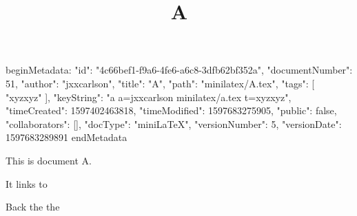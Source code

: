 beginMetadata:
{
    "id": "4c66bef1-f9a6-4fe6-a6c8-3dfb62bf352a",
    "documentNumber": 51,
    "author": "jxxcarlson",
    "title": "A",
    "path": "minilatex/A.tex",
    "tags": [
        "xyzxyz"
    ],
    "keyString": "a a=jxxcarlson minilatex/a.tex t=xyzxyz",
    "timeCreated": 1597402463818,
    "timeModified": 1597683275905,
    "public": false,
    "collaborators": [],
    "docType": "miniLaTeX",
    "versionNumber": 5,
    "versionDate": 1597683289891
}
endMetadata
\title{A}

\maketitle

This is document A.

It links to 

Back the the 

